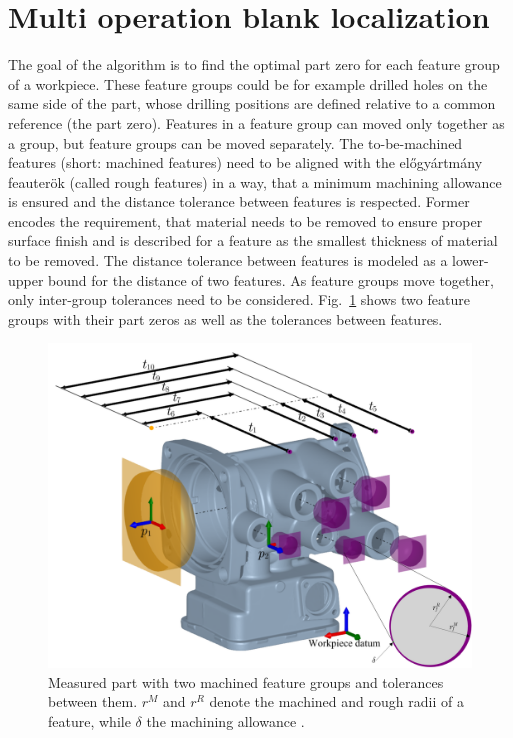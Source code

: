 \documentclass{juliacon}
\begin{document}

\section{Multi operation blank localization}
\label{sec:algo}

The goal of the algorithm is to find the optimal part zero for each feature group of a workpiece.
These feature groups could be for example drilled holes on the same side of the part, whose drilling positions are defined relative to a common reference (the part zero).
Features in a feature group can moved only together as a group, but feature groups can be moved separately.
The to-be-machined features (short: machined features) need to be aligned with the előgyártmány feauterök (called rough features) in a way, that a minimum machining allowance is ensured and the distance tolerance between features is respected.
Former encodes the requirement, that material needs to be removed to ensure proper surface finish and is described for a feature as the smallest thickness of material to be removed.
The distance tolerance between features is modeled as a lower-upper bound for the distance of two features.
As feature groups move together, only inter-group tolerances need to be considered.
Fig.~\ref{fig:hatfig} shows two feature groups with their part zeros as well as the tolerances between features.

\begin{figure}[b]
	\centerline{\includegraphics[width=0.9\columnwidth]{cirp-annals-2023-figure-2.png}}
	\caption{Measured part with two machined feature groups and tolerances between them. $r^M$ and $r^R$ denote the machined and rough radii of a feature, while $\delta$ the machining allowance \cite{cserteg:2023_Annals}.}
	\label{fig:hatfig}
\end{figure}
\end{document}
